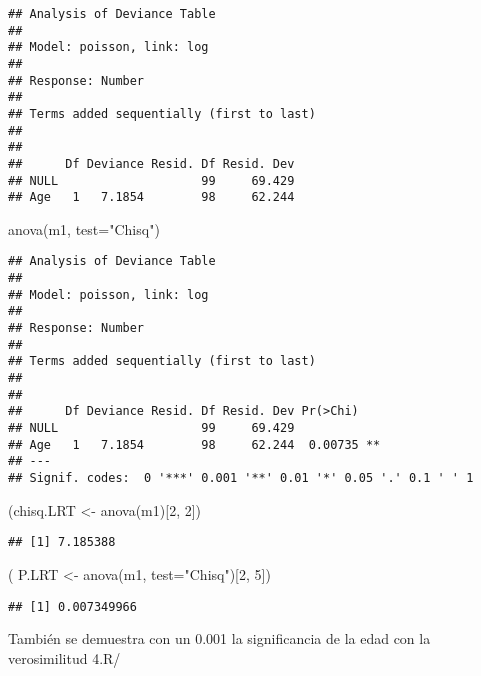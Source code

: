 \documentclass[
]{article}
\newenvironment{Shaded}{\begin{snugshade}}{\end{snugshade}}
\newcommand{\AttributeTok}[1]{\textcolor[rgb]{0.77,0.63,0.00}{#1}}
\newcommand{\DecValTok}[1]{\textcolor[rgb]{0.00,0.00,0.81}{#1}}
\newcommand{\FunctionTok}[1]{\textcolor[rgb]{0.00,0.00,0.00}{#1}}
\newcommand{\NormalTok}[1]{#1}
\newcommand{\OtherTok}[1]{\textcolor[rgb]{0.56,0.35,0.01}{#1}}
\newcommand{\StringTok}[1]{\textcolor[rgb]{0.31,0.60,0.02}{#1}}
\begin{document}
\begin{verbatim}
## Analysis of Deviance Table
## 
## Model: poisson, link: log
## 
## Response: Number
## 
## Terms added sequentially (first to last)
## 
## 
##      Df Deviance Resid. Df Resid. Dev
## NULL                    99     69.429
## Age   1   7.1854        98     62.244
\end{verbatim}

\begin{Shaded}
\begin{Highlighting}[]
\FunctionTok{anova}\NormalTok{(m1, }\AttributeTok{test=}\StringTok{"Chisq"}\NormalTok{)}
\end{Highlighting}
\end{Shaded}

\begin{verbatim}
## Analysis of Deviance Table
## 
## Model: poisson, link: log
## 
## Response: Number
## 
## Terms added sequentially (first to last)
## 
## 
##      Df Deviance Resid. Df Resid. Dev Pr(>Chi)   
## NULL                    99     69.429            
## Age   1   7.1854        98     62.244  0.00735 **
## ---
## Signif. codes:  0 '***' 0.001 '**' 0.01 '*' 0.05 '.' 0.1 ' ' 1
\end{verbatim}

\begin{Shaded}
\begin{Highlighting}[]
\NormalTok{(chisq.LRT }\OtherTok{\textless{}{-}} \FunctionTok{anova}\NormalTok{(m1)[}\DecValTok{2}\NormalTok{, }\DecValTok{2}\NormalTok{])}
\end{Highlighting}
\end{Shaded}

\begin{verbatim}
## [1] 7.185388
\end{verbatim}

\begin{Shaded}
\begin{Highlighting}[]
\NormalTok{( P.LRT }\OtherTok{\textless{}{-}} \FunctionTok{anova}\NormalTok{(m1, }\AttributeTok{test=}\StringTok{"Chisq"}\NormalTok{)[}\DecValTok{2}\NormalTok{, }\DecValTok{5}\NormalTok{])}
\end{Highlighting}
\end{Shaded}

\begin{verbatim}
## [1] 0.007349966
\end{verbatim}

También se demuestra con un 0.001 la significancia de la edad con la
verosimilitud 4.R/
\end{document}
